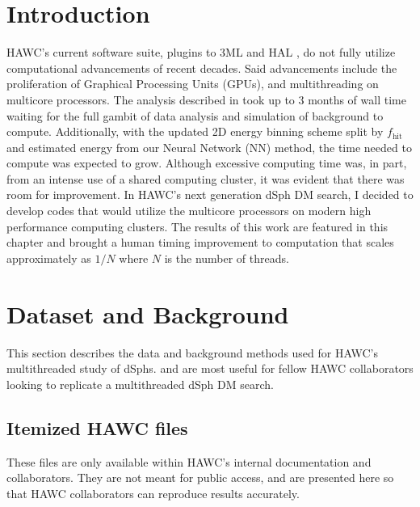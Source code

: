 \section{Introduction}\label{sec:mtd_intro}

HAWC's current software suite, plugins to 3ML and HAL \cite{2021arXiv211201818M,Abeysekara_2017}, do not fully utilize computational advancements of recent decades.
Said advancements include the proliferation of Graphical Processing Units (GPUs), and multithreading on multicore processors.
The analysis described in  took up to 3 months of wall time waiting for the full gambit of data analysis and simulation of background to compute.
Additionally, with the updated 2D energy binning scheme split by $f_\mathrm{hit}$ and estimated energy from our Neural Network (NN) method, the time needed to compute was expected to grow.
Although excessive computing time was, in part, from an intense use of a shared computing cluster, it was evident that there was room for improvement.
In HAWC's next generation dSph DM search, I decided to develop codes that would utilize the multicore processors on modern high performance computing clusters.
The results of this work are featured in this chapter and brought a human timing improvement to computation that scales approximately as $1/N$ where $N$ is the number of threads.

\section{Dataset and Background}\label{sec:mtd_databgd}

This section describes the data and background methods used for HAWC's multithreaded study of dSphs.
 and  are most useful for fellow HAWC collaborators looking to replicate a multithreaded dSph DM search.

\subsection{Itemized HAWC files}\label{sec:mtd_data}
These files are only available within HAWC's internal documentation and collaborators.
They are not meant for public access, and are presented here so that HAWC collaborators can reproduce results accurately.

